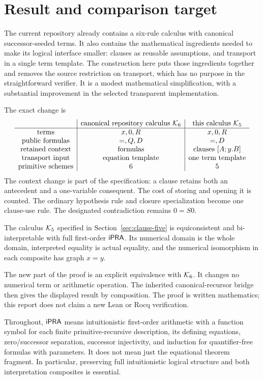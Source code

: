 \section{Result and comparison target}

The current repository already contains a six-rule calculus with canonical successor-seeded terms. It also contains the mathematical ingredients needed to make its logical interface smaller: clauses as reusable assumptions, and transport in a single term template. The construction here puts those ingredients together and removes the source restriction on transport, which has no purpose in the straightforward verifier. It is a modest mathematical simplification, with a substantial improvement in the selected transparent implementation.

The exact change is
\[
\begin{array}{c|c|c}
&\text{canonical repository calculus }\mathcal K_6&\text{this calculus }\mathcal K_5\\\hline
\text{terms}&x,0,R&x,0,R\\
\text{public formulas}&=,Q,D&=,D\\
\text{retained context}&\text{formulas}&\text{clauses }[A;y.B]\\
\text{transport input}&\text{equation template}&\text{one term template}\\
\text{primitive schemes}&6&5
\end{array}
\]
The context change is part of the specification: a clause retains both an antecedent and a one-variable consequent. The cost of storing and opening it is counted. The ordinary hypothesis rule and closure specialization become one clause-use rule. The designated contradiction remains $0=S0$.

\begin{theorem}
The calculus $\mathcal K_5$ specified in Section~\ref{sec:clause-five} is equiconsistent and bi-interpretable with full first-order $\mathsf{iPRA}$. Its numerical domain is the whole domain, interpreted equality is actual equality, and the numerical isomorphism in each composite has graph $x=y$.
\end{theorem}

The new part of the proof is an explicit equivalence with $\mathcal K_6$. It changes no numerical term or arithmetic operation. The inherited canonical-recursor bridge then gives the displayed result by composition. The proof is written mathematics; this report does not claim a new Lean or Rocq verification.

Throughout, $\mathsf{iPRA}$ means intuitionistic first-order arithmetic with a function symbol for each finite primitive-recursive description, its defining equations, zero/successor separation, successor injectivity, and induction for quantifier-free formulas with parameters. It does not mean just the equational theorem fragment. In particular, preserving full intuitionistic logical structure and both interpretation composites is essential.

